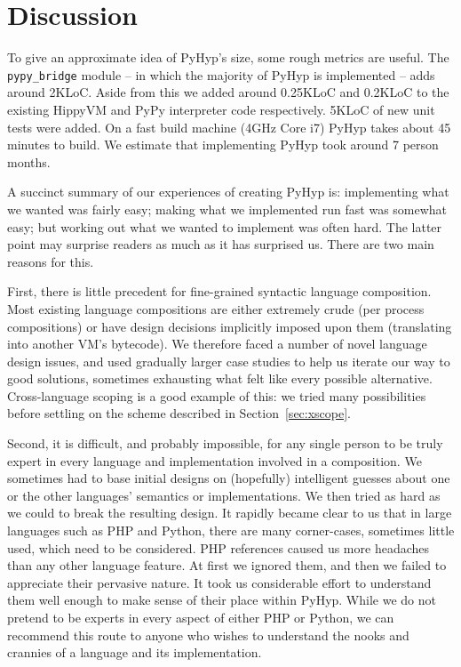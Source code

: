 \documentclass[a4paper,UKenglish]{lipics-v2016}
\newcommand{\ourvm}{PyHyp\xspace}
\newcommand{\hippy}{HippyVM\xspace}
\newcommand{\pypy}{PyPy\xspace}
\begin{document}
\section{Discussion}

To give an approximate idea of \ourvm's size, some rough metrics are useful. The
\texttt{pypy\_\-bridge} module -- in which the majority of \ourvm is implemented
-- adds around 2KLoC. Aside from this we added around
0.25KLoC and 0.2KLoC to the existing \hippy and \pypy interpreter code respectively.
5KLoC of new unit tests were added. On a fast build machine (4GHz Core i7)
\ourvm takes about 45 minutes to build. We estimate that implementing \ourvm took
around 7 person months.

A succinct summary of our experiences of creating \ourvm is: implementing what
we wanted was fairly easy; making what we implemented run fast was somewhat easy;
but working out what we wanted to implement was often hard. The latter point may
surprise readers as much as it has surprised us. There are two main reasons for
this.

First, there is little precedent for fine-grained syntactic language
composition. Most existing language compositions are either extremely crude (per
process compositions) or have design decisions implicitly imposed upon them
(translating into another VM's bytecode). We therefore faced a number of novel
language design issues, and used gradually larger case studies to help us
iterate our way to good solutions, sometimes exhausting what felt like
every possible alternative. Cross-language scoping is a good example of this: we
tried many possibilities before settling on the scheme described in
Section~\ref{sec:xscope}.

Second, it is difficult, and probably impossible,
for any single person to be truly expert in every language and implementation involved in a
composition. We sometimes had to base initial designs on (hopefully) intelligent guesses about
one or the other languages' semantics or implementations. We
then tried as hard as we could to break the resulting design. It rapidly became
clear to us that in large languages such as PHP and Python, there are many
corner-cases, sometimes little used, which need to be considered. PHP references
caused us more headaches than any other language feature. At first we ignored
them, and then we failed to appreciate their pervasive nature.
It took us considerable effort to understand them well enough to
make sense of their place within \ourvm. While we do
not pretend to be experts in every aspect of either PHP or Python, we can recommend this route
to anyone who wishes to understand the nooks and crannies of a language and its
implementation.
\end{document}
